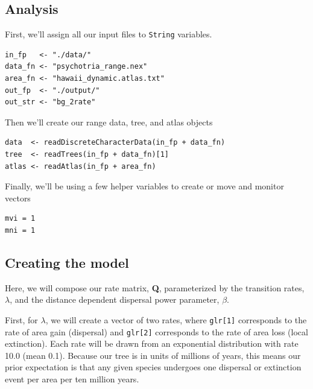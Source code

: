 \subsection{Analysis}

First, we'll assign all our input files to {\tt String} variables.
\begin{snugshade}
\begin{lstlisting}
in_fp   <- "./data/"
data_fn <- "psychotria_range.nex"
area_fn <- "hawaii_dynamic.atlas.txt"
out_fp  <- "./output/"
out_str <- "bg_2rate"
\end{lstlisting}
\end{snugshade}

Then we'll create our range data, tree, and atlas objects

\begin{snugshade}
\begin{lstlisting}
data  <- readDiscreteCharacterData(in_fp + data_fn)
tree  <- readTrees(in_fp + data_fn)[1]
atlas <- readAtlas(in_fp + area_fn)
\end{lstlisting}
\end{snugshade}

Finally, we'll be using a few helper variables to create or move and monitor vectors
\begin{snugshade}
\begin{lstlisting}
mvi = 1
mni = 1
\end{lstlisting}
\end{snugshade}

\subsection{Creating the model}

Here, we will compose our rate matrix, {\bf Q}, parameterized by the transition rates, $\lambda$, and the distance dependent dispersal power parameter, $\beta$.

First, for $\lambda$, we will create a vector of two rates, where {\tt glr[1]} corresponds to the rate of area gain (dispersal) and {\tt glr[2]} corresponds to the rate of area loss (local extinction).
Each rate will be drawn from an exponential distribution with rate 10.0 (mean 0.1).
Because our tree is in units of millions of years, this means our prior expectation is that any given species undergoes one dispersal or extinction event per area per ten million years.



